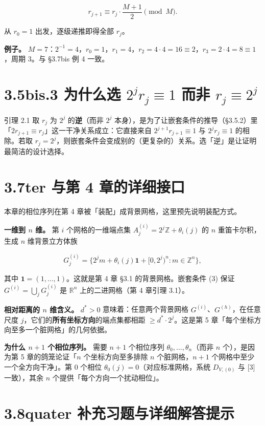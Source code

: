 \documentclass[a4paper,11pt,openany]{ctexbook}
\numberwithin{equation}{chapter}
\numberwithin{figure}{chapter}
\numberwithin{table}{chapter}
\begin{document}
$$r_{j+1}\equiv r_j\cdot\frac{M+1}{2}\pmod M.$$

从 $r_0=1$ 出发，逐级递推即得全部 $r_j$。

\textbf{例子。} $M=7$：$2^{-1}=4$，$r_0=1$，$r_1=4$，$r_2=4\cdot4=16\equiv2$，$r_3=2\cdot4=8\equiv1$，周期 $3$。与 §3.7bis 例 4 一致。

\section{3.5bis.3 为什么选 $2^j r_j\equiv1$ 而非 $r_j\equiv2^j$}

引理 2.1 取 $r_j$ 为 $2^j$ 的\textbf{逆}（而非 $2^j$ 本身），是为了让嵌套条件的推导（§3.5.2）里「$2r_{j+1}\equiv r_j$」这一干净关系成立：它直接来自 $2^{j+1}r_{j+1}\equiv1$ 与 $2^jr_j\equiv1$ 的相除。若取 $r_j=2^j$，则嵌套条件会变成别的（更复杂的）关系。选「逆」是让证明最简洁的设计选择。

\section{3.7ter 与第 4 章的详细接口}

本章的相位序列在第 4 章被「装配」成背景网格，这里预先说明装配方式。

\textbf{一维到 $n$ 维。} 第 $i$ 个网格的一维端点集 $A_j^{(i)}=2^j\mathbb Z+\theta_i(j)$ 的 $n$ 重笛卡尔积，生成 $n$ 维背景立方体族

$$G_j^{(i)}=\{2^j m+\theta_i(j)\mathbf 1+[0,2^j)^n : m\in\mathbb Z^n\},$$

其中 $\mathbf 1=(1,\dots,1)$。这就是第 4 章 §3.1 的背景网格。嵌套条件 (3) 保证 $G^{(i)}=\bigcup_j G_j^{(i)}$ 是 $\mathbb R^n$ 上的二进网格（第 4 章引理 3.1）。

\textbf{相对距离的 $n$ 维含义。} $d^*>0$ 意味着：任意两个背景网格 $G^{(i)}$、$G^{(h)}$，在任意尺度 $j$，它们的\textbf{所有坐标方向}的端点集都相距 $\ge d^*\cdot2^j$。这是第 5 章「每个坐标方向至多一个脏网格」的几何依据。

\textbf{为什么 $n+1$ 个相位序列。} 需要 $n+1$ 个相位序列 $\theta_0,\dots,\theta_n$（而非 $n$ 个），是因为第 5 章的鸽笼论证「$n$ 个坐标方向至多排除 $n$ 个脏网格，$n+1$ 个网格中至少一个全方向干净」。第 $0$ 个相位 $\theta_0(j)=0$（对应标准网格，系统 $D_{V,(0)}$ 与 [3] 一致），其余 $n$ 个提供「每个方向一个扰动相位」。

\section{3.8quater 补充习题与详细解答提示}
\end{document}
